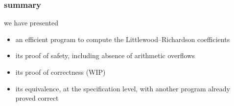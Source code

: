 \documentclass{beamer}
\begin{document}
\begin{frame}\frametitle{summary}
  we have presented
  \begin{itemize}
  \item an efficient program to compute the Littlewood–Richardson coefficients
  \item its proof of safety, including absence of arithmetic overflows
  \item its proof of correctness (WIP)
  \item its equivalence, at the specification level, with another
    program already proved correct
  \end{itemize}
\end{frame}
\end{document}

